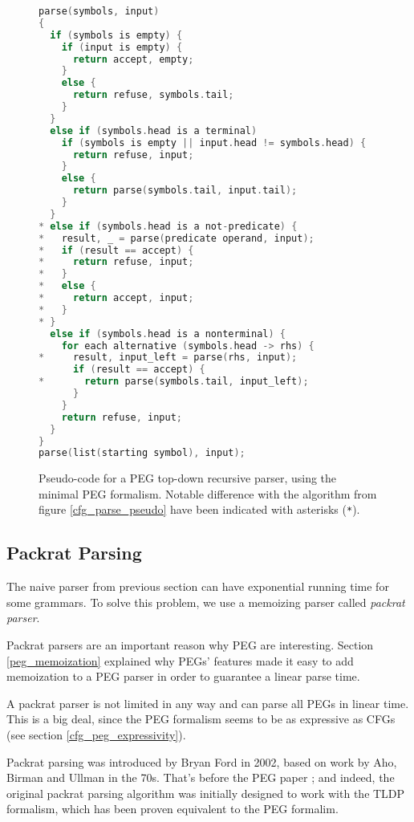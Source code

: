 \begin{figure}
\small
\commentsfive
\begin{lstlisting}[frame=single,language=C]
parse(symbols, input)
{
  if (symbols is empty) {
    if (input is empty) {
      return accept, empty;
    }
    else {
      return refuse, symbols.tail;
    }
  }
  else if (symbols.head is a terminal)
    if (symbols is empty || input.head != symbols.head) {
      return refuse, input;
    }
    else {
      return parse(symbols.tail, input.tail);
    }
  }
* else if (symbols.head is a not-predicate) {
*   result, _ = parse(predicate operand, input);
*   if (result == accept) {
*     return refuse, input;
*   }
*   else {
*     return accept, input;
*   }
* }
  else if (symbols.head is a nonterminal) {
    for each alternative (symbols.head -> rhs) {
*     result, input_left = parse(rhs, input);
      if (result == accept) {
*       return parse(symbols.tail, input_left);
      }
    }
    return refuse, input;
  }
}
parse(list(starting symbol), input);
\end{lstlisting}
\caption{Pseudo-code for a PEG top-down recursive parser, using the minimal PEG
  formalism. Notable difference with the algorithm from figure
  \ref{cfg_parse_pseudo} have been indicated with asterisks (\texttt{*}).}
\label{peg_parse_pseudo}
\end{figure}

\subsection{Packrat Parsing}
\label{packrat_parsing}

The naive parser from previous section can have exponential running time for
some grammars. To solve this problem, we use a memoizing parser called
\emph{packrat parser}.

Packrat parsers are an important reason why PEG are interesting. Section
\ref{peg_memoization} explained why PEGs' features made it easy to add
memoization to a PEG parser in order to guarantee a linear parse time.

A packrat parser is not limited in any way and can parse all PEGs in linear
time. This is a big deal, since the PEG formalism seems to be as expressive as
CFGs (see section \ref{cfg_peg_expressivity}).

Packrat parsing was introduced by Bryan Ford in 2002, based on work by Aho,
Birman and Ullman in the 70s. \cite{ford2002} That's before the PEG paper
\cite{ford2004}; and indeed, the original packrat parsing algorithm was
initially designed to work with the TLDP formalism, which has been proven
equivalent to the PEG formalim. \cite{ford2004}

